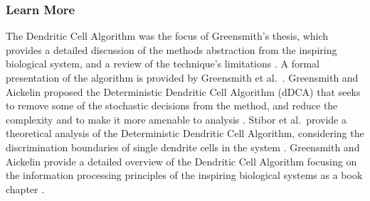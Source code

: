 % 
% 
\subsubsection{Learn More}
The Dendritic Cell Algorithm was the focus of Greensmith's thesis, which provides a detailed discussion of the methods abstraction from the inspiring biological system, and a review of the technique's limitations \cite{Greensmith2007}. 
A formal presentation of the algorithm is provided by Greensmith et al.\ \cite{Greensmith2006a}.
Greensmith and Aickelin proposed the Deterministic Dendritic Cell Algorithm (dDCA) that seeks to remove some of the stochastic decisions from the method, and reduce the complexity and to make it more amenable to analysis \cite{Greensmith2008}.
Stibor et al.\ provide a theoretical analysis of the Deterministic Dendritic Cell Algorithm, considering the discrimination boundaries of single dendrite cells in the system \cite{Stibor2009}. 
Greensmith and Aickelin provide a detailed overview of the Dendritic Cell Algorithm focusing on the information processing principles of the inspiring biological systems as a book chapter \cite{Greensmith2009}.


